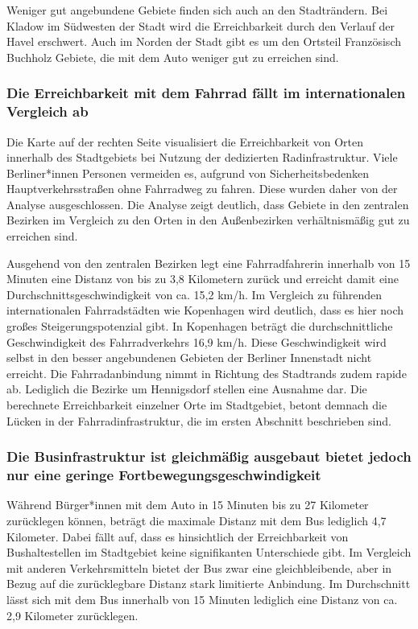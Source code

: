Weniger gut angebundene Gebiete finden sich auch an den Stadträndern. Bei Kladow im Südwesten der Stadt wird die Erreichbarkeit durch den Verlauf der Havel erschwert. Auch im Norden der Stadt gibt es um den Ortsteil Französisch Buchholz Gebiete, die mit dem Auto weniger gut zu erreichen sind.


\subsubsection{Die Erreichbarkeit mit dem Fahrrad fällt im internationalen Vergleich ab}

Die Karte auf der rechten Seite visualisiert die Erreichbarkeit von Orten innerhalb des Stadtgebiets bei Nutzung der dedizierten Radinfrastruktur. Viele Berliner*innen Personen vermeiden es, aufgrund von Sicherheitsbedenken Hauptverkehrsstraßen ohne Fahrradweg zu fahren. Diese wurden daher von der Analyse ausgeschlossen. Die Analyse zeigt deutlich, dass Gebiete in den zentralen Bezirken im Vergleich zu den Orten in den Außenbezirken verhältnismäßig gut zu erreichen sind.

Ausgehend von den zentralen Bezirken legt eine Fahrradfahrerin innerhalb von 15 Minuten eine Distanz von bis zu 3,8 Kilometern zurück und erreicht damit eine Durchschnittsgeschwindigkeit von ca. 15,2 km/h. Im Vergleich zu führenden internationalen Fahrradstädten wie Kopenhagen wird deutlich, dass es hier noch großes Steigerungspotenzial gibt. In Kopenhagen beträgt die durchschnittliche Geschwindigkeit des Fahrradverkehrs 16,9 km/h. Diese Geschwindigkeit wird selbst in den besser angebundenen Gebieten der Berliner Innenstadt nicht erreicht. Die Fahrradanbindung nimmt in Richtung des Stadtrands zudem rapide ab. Lediglich die Bezirke um Hennigsdorf stellen eine Ausnahme dar. Die berechnete Erreichbarkeit einzelner Orte im Stadtgebiet, betont demnach die Lücken in der Fahrradinfrastruktur, die im ersten Abschnitt beschrieben sind.







\subsubsection{Die Businfrastruktur ist gleichmäßig ausgebaut bietet jedoch nur eine geringe Fortbewegungsgeschwindigkeit}
Während Bürger*innen mit dem Auto in 15 Minuten bis zu 27 Kilometer zurücklegen können, beträgt die maximale Distanz mit dem Bus lediglich 4,7 Kilometer. Dabei fällt auf, dass es hinsichtlich der Erreichbarkeit von Bushaltestellen im Stadtgebiet keine signifikanten Unterschiede gibt. Im Vergleich mit anderen Verkehrsmitteln bietet der Bus zwar eine gleichbleibende, aber in Bezug auf die zurücklegbare Distanz stark limitierte Anbindung. Im Durchschnitt lässt sich mit dem Bus innerhalb von 15 Minuten lediglich eine Distanz von ca. 2,9 Kilometer zurücklegen.

